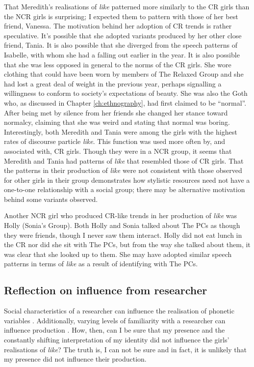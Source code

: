 That Meredith's realisations of \textit{like} patterned more similarly to the CR girls than the NCR girls is surprising; I expected them to pattern with those of her best friend, Vanessa. The motivation behind her adoption of CR trends is rather speculative. It's possible that she adopted variants produced by her other close friend, Tania. It is also possible that she diverged from the speech patterns of Isabelle, with whom she had a falling out earlier in the year. It is also possible that she was less opposed in general to the norms of the CR girls. She wore clothing that could have been worn by members of The Relaxed Group and she had lost a great deal of weight in the previous year, perhaps signalling a willingness to conform to society's expectations of beauty. She was also the Goth who, as discussed in Chapter \ref{ch:ethnography}, had first claimed to be ``normal''. After being met by silence from her friends she changed her stance toward normalcy, claiming that she was weird and stating that normal was boring. Interestingly, both Meredith and Tania were among the girls with the highest rates of discourse particle \textit{like}. This function was used more often by, and associated with, CR girls. Though they were in a NCR group, it seems that Meredith and Tania had patterns of \textit{like} that resembled those of CR girls. That the patterns in their production of \textit{like} were not consistent with those observed for other girls in their group demonstrates how stylistic resources need not have a one-to-one relationship with a social group; there may be alternative motivation behind some variants observed. 

Another NCR girl who produced CR-like trends in her production of \textit{like} was Holly (Sonia's Group). Both Holly and Sonia talked about The PCs as though they were friends, though I never saw them interact. Holly did not eat lunch in the CR nor did she sit with The PCs, but from the way she talked about them, it was clear that she looked up to them. She may have adopted similar speech patterns in terms of \textit{like} as a result of identifying with The PCs.




\subsection{Reflection on influence from researcher}

Social characteristics of a researcher can influence the realisation of phonetic variables \citep{rickfordetal1994}. Additionally, varying levels of familiarity with a researcher can influence production \citep{cukoravilabailey}. How, then, can I be sure that my presence and the constantly shifting interpretation of my identity did not influence the girls' realisations of \textit{like}? The truth is, I can not be sure and in fact, it is unlikely that my presence did not influence their production.

